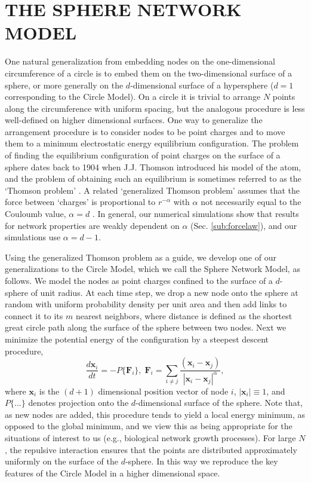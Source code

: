 \documentclass[aps,pre,reprint,superscriptaddress,amsmath,amssymb,nofootinbib]{revtex4-1}
\begin{document}
\section{THE SPHERE NETWORK MODEL}
One natural generalization from embedding nodes on the one-dimensional circumference of a circle is to embed them on the two-dimensional surface of a sphere, or more generally on the $d$-dimensional surface of a hypersphere ($d=1$ corresponding to the Circle Model).
On a circle it is trivial to arrange $N$ points along the circumference with uniform spacing, but the analogous procedure is less well-defined on higher dimensional surfaces.
One way to generalize the arrangement procedure is to consider nodes to be point charges and to move them to a minimum electrostatic energy equilibrium configuration. 
The problem of finding the equilibrium configuration of point charges on the surface of a sphere dates back to 1904 when J.J. Thomson introduced his model of the atom, and the problem of obtaining such an equilibrium is sometimes referred to as the `Thomson problem' \cite{thomson1904}. 
A related `generalized Thomson problem' assumes that the force between `charges' is proportional to $r^{-\alpha}$ with $\alpha$ not necessarily equal to the Couloumb value, $\alpha = d$ \cite{nelson}.
In general, our numerical simulations show that results for network properties are weakly dependent on $\alpha$ (Sec. \ref{sub:forcelaw}), and our simulations use $\alpha = d-1$.

Using the generalized Thomson problem as a guide, we develop one of our generalizations to the Circle Model, which we call the Sphere Network Model, as follows.
We model the nodes as point charges confined to the surface of a $d$-sphere of unit radius.
At each time step, we drop a new node onto the sphere at random with uniform probability density per unit area and then add links to connect it to its $m$ nearest neighbors, where distance is defined as the shortest great circle path along the surface of the sphere between two nodes.
Next we minimize the potential energy of the configuration by a steepest descent procedure, 
\begin{equation}
\frac{d\textbf{x}_i}{dt} = -P\{\textbf{F}_i\},\;
\textbf{F}_i = \sum_{i \neq j} \frac{(\textbf{x}_i - \textbf{x}_j)}{|\textbf{x}_i - \textbf{x}_j|^{\alpha}},
\end{equation}
where $\textbf{x}_i$ is the $(d+1)$ dimensional position vector of node $i$, $|\textbf{x}_i| \equiv 1$, and $P\{...\}$ denotes projection onto the $d$-dimensional surface of the sphere.
Note that, as new nodes are added, this procedure tends to yield a local energy minimum, as opposed to the global minimum, and we view this as being appropriate for the situations of interest to us (e.g., biological network growth processes).
For large $N$, the repulsive interaction ensures that the points are distributed approximately uniformly on the surface of the $d$-sphere.
In this way we reproduce the key features of the Circle Model in a higher dimensional space.
\end{document}
